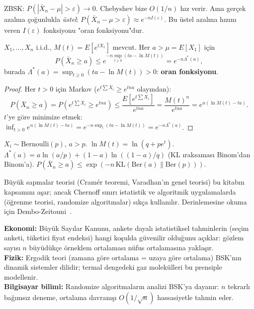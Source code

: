 \begin{motivasyon}
ZBSK: $P(|\bar{X}_n - \mu| > \varepsilon) \to 0$. Chebyshev bize $O(1/n)$ hız verir.
Ama gerçek azalma çoğunlukla \emph{üstel}: $P(\bar{X}_n - \mu > \varepsilon) \approx e^{-nI(\varepsilon)}$.
Bu üstel azalma hızını veren $I(\varepsilon)$ fonksiyonu "oran fonksiyonu"dur.
\end{motivasyon}

\begin{teorem}
\label{thm:chernoff}
$X_1, \ldots, X_n$ i.i.d., $M(t) = E[e^{tX_1}]$ mevcut. Her $a > \mu = E[X_1]$ için
\[
  P(\bar{X}_n \geq a) \leq e^{-n \sup_{t \geq 0}(ta - \ln M(t))} = e^{-n \Lambda^*(a)},
\]
burada $\Lambda^*(a) = \sup_{t \geq 0}(ta - \ln M(t)) > 0$: \textbf{oran fonksiyonu}.
\end{teorem}

\begin{proof}
Her $t > 0$ için Markov ($e^{t\sum X_i} \geq e^{tna}$ olayından):
\[
  P(\bar{X}_n \geq a) = P\!\left(e^{t\sum X_i} \geq e^{tna}\right)
  \leq \frac{E[e^{t\sum X_i}]}{e^{tna}} = \frac{M(t)^n}{e^{tna}} = e^{n(\ln M(t) - ta)}.
\]
$t$'ye göre minimize etmek: $\inf_{t>0} e^{n(\ln M(t)-ta)} = e^{-n\sup_t(ta - \ln M(t))} = e^{-n\Lambda^*(a)}$.
\end{proof}

\begin{ornek}
$X_i \sim \mathrm{Bernoulli}(p)$, $a > p$.
$\ln M(t) = \ln(q + pe^t)$.
$\Lambda^*(a) = a\ln(a/p) + (1-a)\ln((1-a)/q)$ (KL ıraksaması $\mathrm{Binom}$'dan $\mathrm{Binom}$'a).
$P(\bar{X}_n \geq a) \leq \exp(-n\,\mathrm{KL}(\mathrm{Ber}(a)\|\mathrm{Ber}(p)))$.
\end{ornek}

\begin{hocanotu}
Büyük sapmalar teorisi (Cramér teoremi, Varadhan'ın genel teorisi) bu kitabın
kapsamını aşar; ancak Chernoff sınırı istatistik ve algoritmik uygulamalarda
(öğrenme teorisi, randomize algoritmalar) sıkça kullanılır.
Derinlemesine okuma için Dembo-Zeitouni~\cite{Dembo1998}.
\end{hocanotu}

\begin{kopru}
\textbf{Ekonomi:} Büyük Sayılar Kanunu, ankete dayalı istatistiksel tahminlerin
(seçim anketi, tüketici fiyat endeksi) hangi koşulda güvenilir olduğunu açıklar:
gözlem sayısı $n$ büyüdükçe örneklem ortalaması nüfus ortalamasına yaklaşır.\\
\textbf{Fizik:} Ergodik teori (zamana göre ortalama = uzaya göre ortalama)
BSK'nın dinamik sistemler dilidir; termal dengedeki gaz molekülleri bu prensiple modellenir.\\
\textbf{Bilgisayar bilimi:} Randomize algoritmaların analizi BSK'ya dayanır:
$n$ tekrarlı bağımsız deneme, ortalama davranışı $O(1/\sqrt{n})$ hassasiyetle tahmin eder.
\end{kopru}

